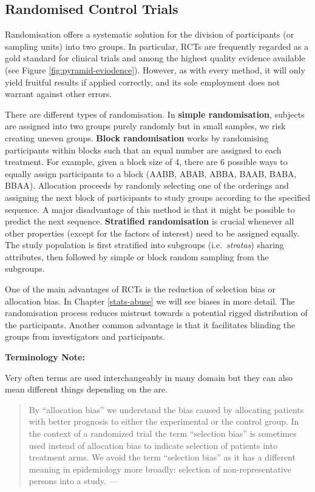 \documentclass[
]{book}
\begin{document}
\hypertarget{randomised-control-trials}{%
\subsection{Randomised Control Trials}\label{randomised-control-trials}}

Randomisation offers a systematic solution for the division of participants (or sampling units) into two groups. In particular, RCTs are frequently regarded as a gold standard for clinical trials and among the highest quality evidence available (see Figure \ref{fig:pyramid-eviodence}). However, as with every method, it will only yield fruitful results if applied correctly, and its sole employment does not warrant against other errors.

There are different types of randomisation. In \textbf{simple randomisation}, subjects are assigned into two groups purely randomly but in small samples, we risk creating uneven groups. \textbf{Block randomisation} works by randomising participants within blocks such that an equal number are assigned to each treatment. For example, given a block size of 4, there are 6 possible ways to equally assign participants to a block (AABB, ABAB, ABBA, BAAB, BABA, BBAA). Allocation proceeds by randomly selecting one of the orderings and assigning the next block of participants to study groups according to the specified sequence. A major disadvantage of this method is that it might be possible to predict the next sequence. \textbf{Stratified randomisation} is crucial whenever all other properties (except for the factors of interest) need to be assigned equally. The study population is first stratified into subgroups (i.e.~\emph{stratas}) sharing attributes, then followed by simple or block random sampling from the subgroups.

One of the main advantages of RCTs is the reduction of selection bias or allocation bias. In Chapter \ref{stats-abuse} we will see biases in more detail. The randomisation process reduces mistrust towards a potential rigged distribution of the participants. Another common advantage is that it facilitates blinding the groups from investigators and participants.

\begin{tipbox}

\textbf{Terminology Note:}

Very often terms are used interchangeably in many domain but they can also mean different things depending on the are.

\begin{quote}
By ``allocation bias'' we understand the bias caused by allocating patients with better prognosis to either the experimental or the control group. In the context of a randomized trial the term ``selection bias'' is sometimes used instead of allocation bias to indicate selection of patients into treatment arms. We avoid the term ``selection bias'' as it has a different meaning in epidemiology more broadly: selection of non-representative persons into a study. --- \citep{paludan2016mechanisms}
\end{quote}

\end{tipbox}
\end{document}
